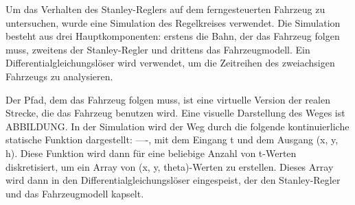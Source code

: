 \documentclass[arbeit=studie,oneside,BCOR=12mm]{ArbeitRST}
\begin{document}
%
%
%
%

Um das Verhalten des Stanley-Reglers auf dem ferngesteuerten Fahrzeug zu untersuchen, wurde eine Simulation des Regelkreises verwendet.
Die Simulation besteht aus drei Hauptkomponenten: erstens die Bahn, der das Fahrzeug folgen muss, zweitens der Stanley-Regler und drittens das Fahrzeugmodell. Ein Differentialgleichungslöser wird verwendet, um die Zeitreihen des zweiachsigen Fahrzeugs zu analysieren. 

Der Pfad, dem das Fahrzeug folgen muss, ist eine virtuelle Version der realen Strecke, die das Fahrzeug benutzen wird. Eine visuelle Darstellung des Weges ist ABBILDUNG. In der Simulation wird der Weg durch die folgende kontinuierliche statische Funktion dargestellt:
----, 
mit dem Eingang t und dem Ausgang (x, y, h). Diese Funktion wird dann für eine beliebige Anzahl von t-Werten diskretisiert, um ein Array von (x, y, theta)-Werten zu erstellen. Dieses Array wird dann in den Differentialgleichungslöser eingespeist, der den Stanley-Regler und das Fahrzeugmodell kapselt. 
\end{document}
